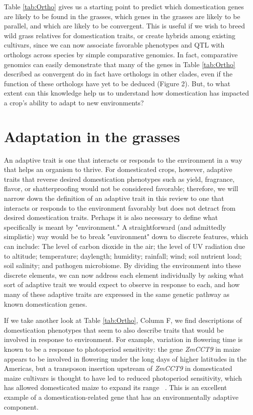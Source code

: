 \documentclass[12pt]{article}
\begin{document}
Table \ref{tab:Ortho} gives us a starting point to predict which domestication genes are likely to be found in the grasses, which genes in the grasses are likely to be parallel, and which are likely to be convergent.
This is useful if we wish to breed wild grass relatives for domestication traits, or create hybrids among existing cultivars, since we can now associate favorable phenotypes and QTL with orthologs across species by simple comparative genomics.
In fact, comparative genomics can easily demonstrate that many of the genes in Table \ref{tab:Ortho} described as convergent do in fact have orthologs in other clades, even if the function of these orthologs have yet to be deduced (Figure 2).
But, to what extent can this knowledge help us to understand how domestication has impacted a crop's ability to adapt to new environments?
\paragraph{}

\section*{Adaptation in the grasses}
An adaptive trait is one that interacts or responds to the environment in a way that helps an organism to thrive. For domesticated crops, however, adaptive traits that reverse desired domestication phenotypes such as yield, fragrance, flavor, or shatterproofing would not be considered favorable; therefore, we will narrow down the definition of an adaptive trait in this review to one that interacts or responds to the environment favorably but does not detract from desired domestication traits.  Perhaps it is also necessary to define what specifically is meant by "environment." A straightforward (and admittedly simplistic) way would be to break  "environment" down to discrete features, which can include: The level of carbon dioxide in the air; the level of UV radiation due to altitude; temperature; daylength; humidity; rainfall; wind; soil nutrient load; soil salinity; and pathogen microbiome.  By dividing the environment into these discrete elements, we can now address each element individually by asking what sort of adaptive trait we would expect to observe in response to each, and how many of these adaptive traits are expressed in the same genetic pathway as known domestication genes. 

If we take another look at Table \ref{tab:Ortho}, Column F, we find descriptions of domestication phenotypes that seem to also describe traits that would be involved in response to environment. For example, variation in flowering time is known to be a response to photoperiod sensitivity: the gene \textit{ZmCCT9} in maize appears to be involved in flowering under the long days of higher latitudes in the Americas, but a transposon insertion upstream of \textit{ZmCCT9} in domesticated maize cultivars is thought to have led to reduced photoperiod sensitivity, which has allowed domesticated maize to expand its range ~\citep{Huang2017}.  This is an excellent example of a domestication-related gene that has an environmentally adaptive component. 
\end{document}

